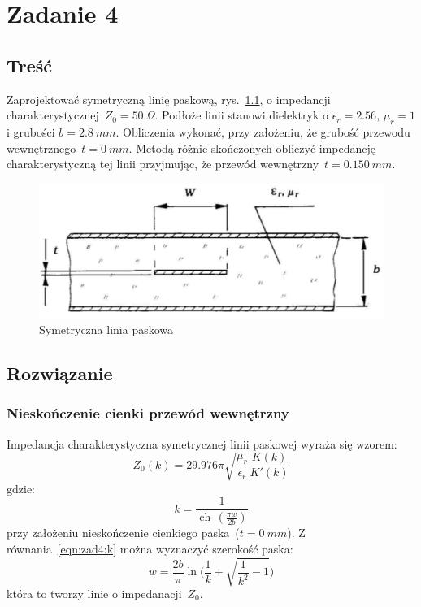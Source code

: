 \documentclass[rep.tex]{subfiles}
\begin{document}
\chapter{Zadanie 4}
\label{zad4}
\section{Treść}
Zaprojektować symetryczną linię paskową, rys.~\ref{fig:zad4:stripline},
o impedancji charakterystycznej~$Z_0 = 50~\Omega$.
Podłoże linii stanowi dielektryk o $\epsilon_r = 2.56$, $\mu_r = 1$ i grubości $b = 2.8~mm$.
Obliczenia wykonać, przy założeniu, że grubość przewodu wewnętrznego~$t = 0~mm$.
Metodą różnic skończonych obliczyć impedancję charakterystyczną tej linii przyjmując,
że przewód wewnętrzny~$t = 0.150~mm$.

\begin{figure}[!htbp]
  \centering
  \includegraphics[scale=0.5]{fig/zad4/stripline}
  \caption{Symetryczna linia paskowa}
  \label{fig:zad4:stripline}
\end{figure}

\section{Rozwiązanie}
\subsection{Nieskończenie cienki przewód wewnętrzny}
\label{zad4:thin}
Impedancja charakterystyczna symetrycznej linii paskowej wyraża się wzorem:
\begin{equation}
  Z_0(k) = 29.976 \pi \sqrt{\frac{\mu_r}{\epsilon_r}} \frac{K(k)}{K'(k)} \label{eqn:zad4:z}
\end{equation}
gdzie:
\begin{equation}
  k = \frac{1}{\operatorname{ch}\,(\frac{\pi w}{2b})} \label{eqn:zad4:k}
\end{equation}
przy założeniu nieskończenie cienkiego paska~($t = 0~mm$).
Z równania~\ref{eqn:zad4:k} można wyznaczyć szerokość paska:
\begin{equation}
  w = \frac{2b}{\pi} \ln\big(\frac{1}{k} + \sqrt{\frac{1}{k^2} - 1}\big) \label{eqn:zad4:w}
\end{equation}
która to tworzy linie o impedanacji~$Z_0$.
\end{document}
